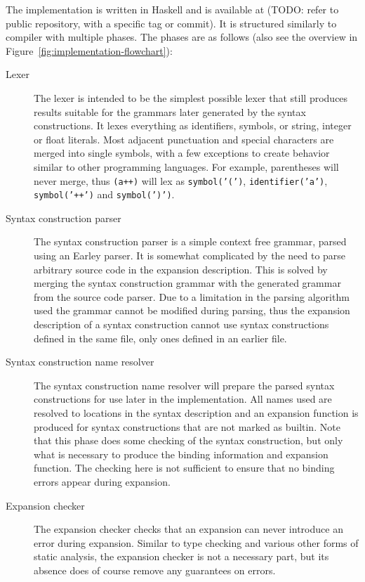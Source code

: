 \documentclass{kththesis}
\begin{document}
The implementation is written in Haskell and is available at (TODO: refer to public repository, with a specific tag or commit). It is structured similarly to compiler with multiple phases. The phases are as follows (also see the overview in Figure~\ref{fig:implementation-flowchart}):

\begin{description}
  \item[Lexer] The lexer is intended to be the simplest possible lexer that still produces results suitable for the grammars later generated by the syntax constructions. It lexes everything as identifiers, symbols, or string, integer or float literals. Most adjacent punctuation and special characters are merged into single symbols, with a few exceptions to create behavior similar to other programming languages. For example, parentheses will never merge, thus \texttt{(a++)} will lex as \texttt{symbol('(')}, \texttt{identifier('a')}, \texttt{symbol('++')} and \texttt{symbol(')')}.

  \item[Syntax construction parser] The syntax construction parser is a simple context free grammar, parsed using an Earley \cite{Earley1970An-Efficient-Co} parser. It is somewhat complicated by the need to parse arbitrary source code in the expansion description. This is solved by merging the syntax construction grammar with the generated grammar from the source code parser. Due to a limitation in the parsing algorithm used the grammar cannot be modified during parsing, thus the expansion description of a syntax construction cannot use syntax constructions defined in the same file, only ones defined in an earlier file.

  \item[Syntax construction name resolver] The syntax construction name resolver will prepare the parsed syntax constructions for use later in the implementation. All names used are resolved to locations in the syntax description and an expansion function is produced for syntax constructions that are not marked as builtin. Note that this phase does some checking of the syntax construction, but only what is necessary to produce the binding information and expansion function. The checking here is not sufficient to ensure that no binding errors appear during expansion.

  \item[Expansion checker] The expansion checker checks that an expansion can never introduce an error during expansion. Similar to type checking and various other forms of static analysis, the expansion checker is not a necessary part, but its absence does of course remove any guarantees on errors.


\end{description}
\end{document}
